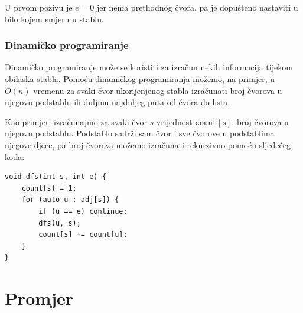 U prvom pozivu je $e=0$ jer nema
prethodnog čvora, pa je dopušteno
nastaviti u bilo kojem smjeru u stablu.

\subsubsection{Dinamičko programiranje}

Dinamičko programiranje može se koristiti za izračun
nekih informacija tijekom obilaska stabla.
Pomoću dinamičkog programiranja možemo, na primjer,
u $O(n)$ vremenu za svaki čvor ukorijenjenog stabla izračunati
broj čvorova u njegovu podstablu
ili duljinu najduljeg puta od čvora
do lista.

Kao primjer, izračunajmo za svaki čvor $s$
vrijednost $\texttt{count}[s]$: broj čvorova u njegovu podstablu.
Podstablo sadrži sam čvor i
sve čvorove u podstablima njegove djece,
pa broj čvorova možemo izračunati
rekurzivno pomoću sljedećeg koda:

\begin{lstlisting}
void dfs(int s, int e) {
    count[s] = 1;
    for (auto u : adj[s]) {
        if (u == e) continue;
        dfs(u, s);
        count[s] += count[u];
    }
}
\end{lstlisting}

\section{Promjer}


